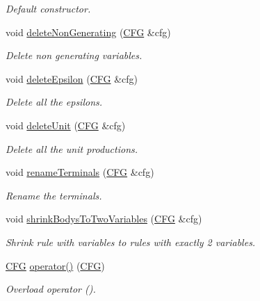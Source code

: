 \begin{DoxyCompactItemize}
\begin{DoxyCompactList}\small\item\em \-Default constructor. \end{DoxyCompactList}\item 
void \hyperlink{class_c_f_g2_c_n_f_a2c7aa48867cb7b5d4c0909e0049beee5}{delete\-Non\-Generating} (\hyperlink{class_c_f_g}{\-C\-F\-G} \&cfg)
\begin{DoxyCompactList}\small\item\em \-Delete non generating variables. \end{DoxyCompactList}\item 
void \hyperlink{class_c_f_g2_c_n_f_a3b3c893d912429dd9bb81f7cc49d6120}{delete\-Epsilon} (\hyperlink{class_c_f_g}{\-C\-F\-G} \&cfg)
\begin{DoxyCompactList}\small\item\em \-Delete all the epsilons. \end{DoxyCompactList}\item 
void \hyperlink{class_c_f_g2_c_n_f_a1bc2877d3b27199ea686f4247875b16a}{delete\-Unit} (\hyperlink{class_c_f_g}{\-C\-F\-G} \&cfg)
\begin{DoxyCompactList}\small\item\em \-Delete all the unit productions. \end{DoxyCompactList}\item 
void \hyperlink{class_c_f_g2_c_n_f_a9a657d7c810681aea6434983be4c9a80}{rename\-Terminals} (\hyperlink{class_c_f_g}{\-C\-F\-G} \&cfg)
\begin{DoxyCompactList}\small\item\em \-Rename the terminals. \end{DoxyCompactList}\item 
void \hyperlink{class_c_f_g2_c_n_f_ab5c05068861df3af29a7bd373a06f7bf}{shrink\-Bodys\-To\-Two\-Variables} (\hyperlink{class_c_f_g}{\-C\-F\-G} \&cfg)
\begin{DoxyCompactList}\small\item\em \-Shrink rule with variables to rules with exactly 2 variables. \end{DoxyCompactList}\item 
\hyperlink{class_c_f_g}{\-C\-F\-G} \hyperlink{class_c_f_g2_c_n_f_abd3ece85126cd039413a047aea38e309}{operator()} (\hyperlink{class_c_f_g}{\-C\-F\-G})
\begin{DoxyCompactList}\small\item\em \-Overload operator (). \end{DoxyCompactList}\end{DoxyCompactItemize}


